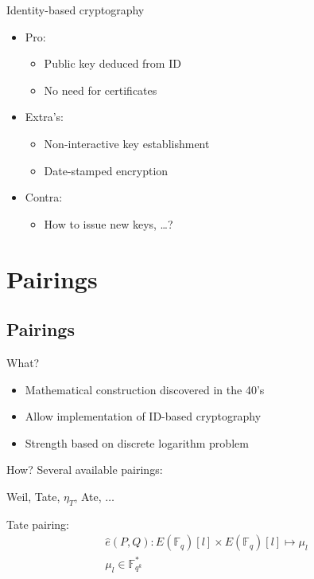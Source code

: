 \documentclass[svgnames]{beamer}
\begin{document}
\begin{frame}{Identity-based cryptography}
	\begin{itemize}
		\item Pro:
			\begin{itemize}
				\item Public key deduced from ID
				\item No need for certificates
			\end{itemize}
		\item Extra's:
			\begin{itemize}
				\item Non-interactive key establishment
				\item Date-stamped encryption
			\end{itemize}
		\item Contra:
			\begin{itemize}
				\item How to issue new keys, \ldots ?
			\end{itemize}
	\end{itemize}
\end{frame}

\section{Pairings}
\subsection*{Pairings}
\begin{frame}{What?}
	\begin{itemize}
		\item Mathematical construction discovered in the 40's
		\item Allow implementation of ID-based cryptography
		\item Strength based on discrete logarithm problem
	\end{itemize}
\end{frame}

\begin{frame}{How?}
	Several available pairings:
	\begin{center}Weil, \alert{Tate}, $\eta _T$, Ate, $\ldots$\end{center}
	
	Tate pairing:	
	\[\begin{gathered}
		\hat{e}(P, Q) : E(\mathbb{F}_q)[l] \times E(\mathbb{F}_q)[l] \mapsto \mu _l \\
		\mu _l \in 	\mathbb{F}_{q^k}^*
	\end{gathered}\]
	
\end{frame}
\end{document}
